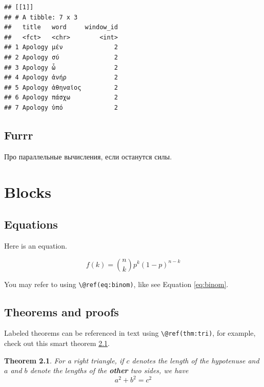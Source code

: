 \documentclass[
]{book}
\newtheorem{theorem}{Theorem}[chapter]
\theoremstyle{definition}
\theoremstyle{definition}
\theoremstyle{definition}
\theoremstyle{definition}
\theoremstyle{remark}
\begin{document}
\begin{verbatim}
## [[1]]
## # A tibble: 7 x 3
##   title   word     window_id
##   <fct>   <chr>        <int>
## 1 Apology μέν              2
## 2 Apology σύ               2
## 3 Apology ὦ                2
## 4 Apology ἀνήρ             2
## 5 Apology ἀθηναῖος         2
## 6 Apology πάσχω            2
## 7 Apology ὑπό              2
\end{verbatim}

\hypertarget{furrr}{%
\section{Furrr}\label{furrr}}

Про параллельные вычисления, если останутся силы.

\hypertarget{blocks}{%
\chapter{Blocks}\label{blocks}}

\hypertarget{equations}{%
\section{Equations}\label{equations}}

Here is an equation.

\begin{equation} 
  f\left(k\right) = \binom{n}{k} p^k\left(1-p\right)^{n-k}
  \label{eq:binom}
\end{equation}

You may refer to using \texttt{\textbackslash{}@ref(eq:binom)}, like see Equation \eqref{eq:binom}.

\hypertarget{theorems-and-proofs}{%
\section{Theorems and proofs}\label{theorems-and-proofs}}

Labeled theorems can be referenced in text using \texttt{\textbackslash{}@ref(thm:tri)}, for example, check out this smart theorem \ref{thm:tri}.

\begin{theorem}
\protect\hypertarget{thm:tri}{}\label{thm:tri}For a right triangle, if \(c\) denotes the \emph{length} of the hypotenuse
and \(a\) and \(b\) denote the lengths of the \textbf{other} two sides, we have
\[a^2 + b^2 = c^2\]
\end{theorem}
\end{document}
